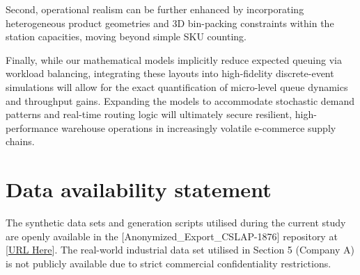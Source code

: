 \documentclass[preprint,review,11pt,authoryear]{elsarticle}
\begin{document}
Second, operational realism can be further enhanced by incorporating heterogeneous product geometries and 3D bin-packing constraints within the station capacities, moving beyond simple SKU counting. 

Finally, while our mathematical models implicitly reduce expected queuing via workload balancing, integrating these layouts into high-fidelity discrete-event simulations will allow for the exact quantification of micro-level queue dynamics and throughput gains. Expanding the models to accommodate stochastic demand patterns and real-time routing logic will ultimately secure resilient, high-performance warehouse operations in increasingly volatile e-commerce supply chains.





\section*{Data availability statement}
The synthetic data sets and generation scripts utilised during the current study are openly available in the [Anonymized\_Export\_CSLAP-1876] repository at [\href{https://anonymous.4open.science/r/Anonymized_Export_CSLAP-1876/}{URL Here}]. The real-world industrial data set utilised in Section 5 (Company A) is not publicly available due to strict commercial confidentiality restrictions.



\end{document}
